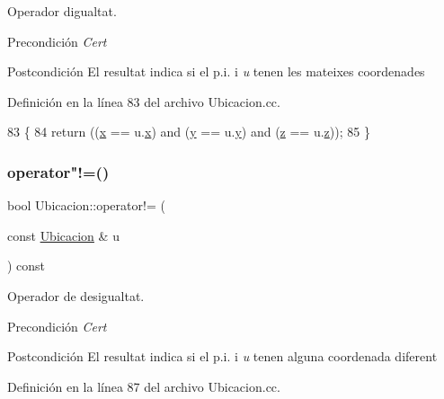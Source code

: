 Operador d\textquotesingle{}igualtat. 

\begin{DoxyPrecond}{Precondición}
{\itshape Cert} 
\end{DoxyPrecond}
\begin{DoxyPostcond}{Postcondición}
El resultat indica si el p.\+i. i {\itshape u} tenen les mateixes coordenades 
\end{DoxyPostcond}


Definición en la línea 83 del archivo Ubicacion.\+cc.


\begin{DoxyCode}
83                                                    \{
84   \textcolor{keywordflow}{return} ((\hyperlink{class_ubicacion_aa025967df0ca8761587b09a38cf5b798}{x} == u.\hyperlink{class_ubicacion_aa025967df0ca8761587b09a38cf5b798}{x}) and (\hyperlink{class_ubicacion_ab314f05b8da651aabb8a623467919a94}{y} == u.\hyperlink{class_ubicacion_ab314f05b8da651aabb8a623467919a94}{y}) and (\hyperlink{class_ubicacion_ad74770f35bf4b18d3959b78cd90b6eb0}{z} == u.\hyperlink{class_ubicacion_ad74770f35bf4b18d3959b78cd90b6eb0}{z}));
85 \}
\end{DoxyCode}
\mbox{\label{class_ubicacion_a5caac27fa52a8e5fddd5ab50b0d56bd1}} 
\subsubsection{\texorpdfstring{operator"!=()}{operator!=()}}
{\footnotesize\ttfamily bool Ubicacion\+::operator!= (\begin{DoxyParamCaption}\item[{const \hyperlink{class_ubicacion}{Ubicacion} \&}]{u }\end{DoxyParamCaption}) const}



Operador de desigualtat. 

\begin{DoxyPrecond}{Precondición}
{\itshape Cert} 
\end{DoxyPrecond}
\begin{DoxyPostcond}{Postcondición}
El resultat indica si el p.\+i. i {\itshape u} tenen alguna coordenada diferent 
\end{DoxyPostcond}


Definición en la línea 87 del archivo Ubicacion.\+cc.


